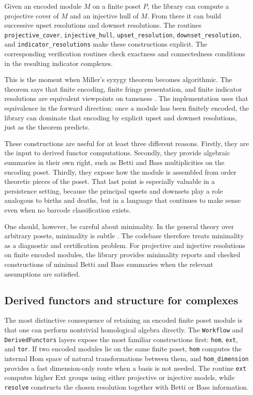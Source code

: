 \documentclass[11pt]{article}
\theoremstyle{definition}
\theoremstyle{remark}
\begin{document}
Given an encoded module $M$ on a finite poset $P$, the library can compute a projective cover of $M$ and an injective hull of $M$.  From there it can build successive upset resolutions and downset resolutions.  The routines \texttt{projective\_cover}, \texttt{injective\_hull}, \texttt{upset\_resolution}, \texttt{downset\_resolution}, and \texttt{indicator\_resolutions} make these constructions explicit.  The corresponding verification routines check exactness and connectedness conditions in the resulting indicator complexes.

This is the moment when Miller's syzygy theorem becomes algorithmic.  The theorem says that finite encoding, finite fringe presentation, and finite indicator resolutions are equivalent viewpoints on tameness \cite{Mil20}.  The implementation uses that equivalence in the forward direction: once a module has been finitely encoded, the library can dominate that encoding by explicit upset and downset resolutions, just as the theorem predicts.

These constructions are useful for at least three different reasons.  Firstly, they are the input to derived functor computations.  Secondly, they provide algebraic summaries in their own right, such as Betti and Bass multiplicities on the encoding poset.  Thirdly, they expose how the module is assembled from order theoretic pieces of the poset.  That last point is especially valuable in a persistence setting, because the principal upsets and downsets play a role analogous to births and deaths, but in a language that continues to make sense even when no barcode classification exists.

One should, however, be careful about minimality.  In the general theory over arbitrary posets, minimality is subtle \cite{Mil20}.  The codebase therefore treats minimality as a diagnostic and certification problem. For projective and injective resolutions on finite encoded modules, the library provides minimality reports and checked constructions of minimal Betti and Bass summaries when the relevant assumptions are satisfied.

\subsection{Derived functors and structure for complexes}

The most distinctive consequence of retaining an encoded finite poset module is that one can perform nontrivial homological algebra directly.  The \texttt{Workflow} and \texttt{DerivedFunctors} layers expose the most familiar constructions first: \texttt{hom}, \texttt{ext}, and \texttt{tor}.  If two encoded modules lie on the same finite poset, \texttt{hom} computes the internal Hom space of natural transformations between them, and \texttt{hom\_dimension} provides a fast dimension-only route when a basis is not needed.  The routine \texttt{ext} computes higher Ext groups using either projective or injective models, while \texttt{resolve} constructs the chosen resolution together with Betti or Bass information.
\end{document}
